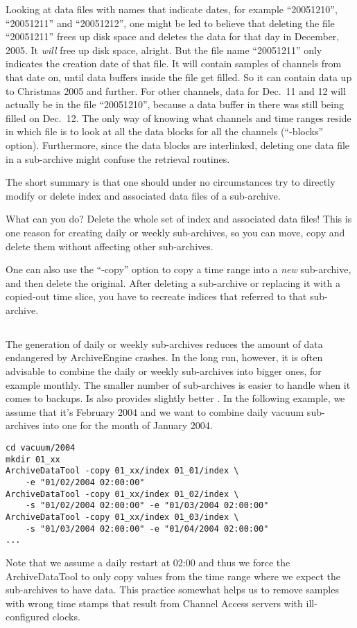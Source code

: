 Looking at data files with names that indicate dates, for example
``20051210'', ``20051211'' and ``20051212'', one might be led to
believe that deleting the file ``20051211'' frees up disk space and
deletes the data for that day in December, 2005.  It \emph{will} free
up disk space, alright. But the file name ``20051211'' only indicates
the creation date of that file.  It will contain samples of channels
from that date on, until data buffers inside the file get filled.  So
it can contain data up to Christmas 2005 and further.  For other
channels, data for Dec.\ 11 and 12 will actually be in the file ``20051210'',
because a data buffer in there was still being filled on Dec.\ 12.
The only way of knowing what channels and time ranges reside in which
file is to look at all the data blocks for all the channels
(``-blocks'' option).  Furthermore, since the data blocks are interlinked,
deleting one data file in a sub-archive might confuse the retrieval
routines.

\NOTE The short summary is that one should under no circumstances try
to directly modify or delete index and associated data files of a sub-archive.

What can you do? Delete the whole set of index and associated data
files! This is one reason for creating daily or weekly sub-archives,
so you can move, copy and delete them without affecting other
sub-archives.

One can also use the ``-copy'' option to copy a time range into a
\emph{new} sub-archive, and then delete the original.
After deleting a sub-archive or replacing it with a copied-out time
slice, you have to recreate indices that referred to that sub-archive.

\subsection{}
The generation of daily or weekly sub-archives reduces the amount of data
endangered by ArchiveEngine crashes. In the long run, however, it is often
advisable to combine the daily or weekly sub-archives into bigger ones, for
example monthly. The smaller number of sub-archives is easier to
handle when it comes to backups. Is also provides slightly better
. 
In the following example, we assume that it's February 2004 and we want
to combine daily vacuum sub-archives into one for the month of January
2004.
\begin{lstlisting}[frame=none,keywordstyle=\sffamily]
cd vacuum/2004
mkdir 01_xx
ArchiveDataTool -copy 01_xx/index 01_01/index \
    -e "01/02/2004 02:00:00"
ArchiveDataTool -copy 01_xx/index 01_02/index \
    -s "01/02/2004 02:00:00" -e "01/03/2004 02:00:00"
ArchiveDataTool -copy 01_xx/index 01_03/index \
    -s "01/03/2004 02:00:00" -e "01/04/2004 02:00:00"
...
\end{lstlisting}
\noindent Note that we assume a daily restart at 02:00 and thus we
force the ArchiveDataTool to only copy values from the time range
where we expect the sub-archives to have data. This practice somewhat
helps us to remove samples with wrong time stamps that result from
Channel Access servers with ill-configured clocks.

